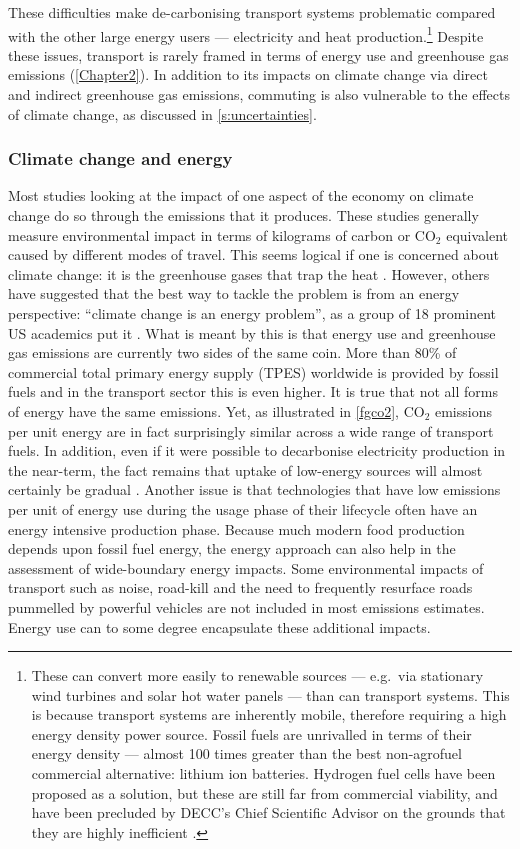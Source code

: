 These difficulties make de-carbonising transport systems problematic
compared with the other large energy users --- electricity and heat
production.\footnote{These can convert more easily to renewable
sources --- e.g.~via stationary wind turbines
and solar hot water panels --- than can transport systems.
This is because transport systems are inherently mobile,
therefore requiring a high energy density power source.
Fossil fuels are unrivalled in terms of their energy density ---
almost 100 times greater than the best non-agrofuel commercial alternative:
lithium ion batteries. %
Hydrogen fuel cells have been proposed as a solution, but these are
still far from commercial viability, and have been 
precluded by DECC's Chief Scientific Advisor on the
grounds that they are highly inefficient \citep{MacKay2009}.}
Despite these issues, transport is rarely framed in terms of energy use and
greenhouse gas emissions (\cref{Chapter2}). In addition to
its impacts on climate change via direct and indirect greenhouse gas emissions,
commuting is also vulnerable to the effects of climate change,
as discussed in \cref{s:uncertainties}.

\subsubsection{Climate change and energy}
Most studies looking at the impact of one aspect of the economy on climate
change do so through the emissions that it produces.
These studies generally measure environmental impact in terms of kilograms of
carbon or  CO$_2$ equivalent caused by different modes of travel.
This seems logical if one is concerned about climate change:
it is the greenhouse gases that trap the heat \citep{Houghton1990}.
However, others have suggested
that the best way to tackle the problem is from an energy perspective:
``climate change is an energy problem'', as a group of 18 prominent US
academics put it \citep[p.~981]{Hoffert2002}. What is meant by this is that
energy use and greenhouse gas emissions are currently two sides of the same
coin. More than 80\% of commercial total primary energy supply (TPES)
worldwide is provided by fossil fuels \citep{Smil2008} and in the
transport sector this is even higher.
It is true that not all forms of energy have the same emissions. Yet,
as illustrated in \cref{fgco2}, CO$_2$ emissions per unit energy are
in fact surprisingly similar across a wide range of transport fuels.
In addition, even if it were possible to decarbonise electricity
production in the near-term, the fact remains that uptake of low-energy sources
will almost certainly be gradual \citep{smil2010energy}. Another issue is
that technologies that have low emissions per unit of energy use during the
usage phase of their lifecycle often have an energy intensive production
phase. Because much modern food production depends upon fossil fuel energy,
the energy approach can also help in the
assessment of wide-boundary energy impacts.
Some environmental impacts of transport such as noise, road-kill and
the need to frequently resurface roads pummelled by powerful vehicles are not
included in most emissions estimates. Energy use can to some degree
encapsulate these additional impacts.

